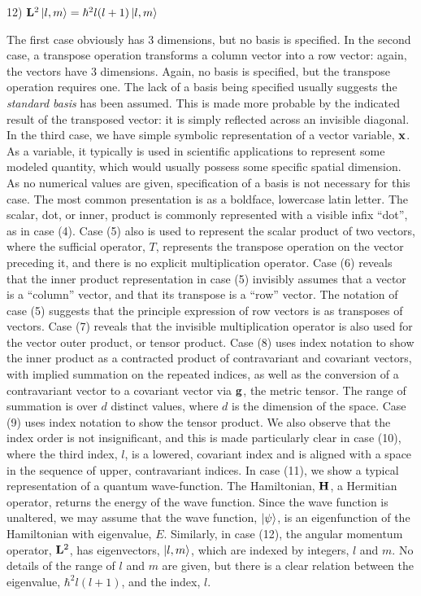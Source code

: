\documentclass{llncs}
\def\ket#1{\mathinner{|{#1}\rangle}}
\begin{document}
12) ${\bf L}^2 \ket{l,m} = \hbar^2l(l+1) \ket{l,m}$


The first case obviously has 3 dimensions, but no basis is specified.
In the second case, a transpose operation transforms a column vector
into a row vector: again, the vectors have 3 dimensions.
Again, no basis is specified, but the transpose operation requires
one.
The lack of a basis being specified usually suggests the
{\em standard basis} has been assumed.
This is made more probable by the indicated result of the transposed
vector: it is simply reflected across an invisible diagonal.
In the third case, we have simple symbolic representation of a vector
variable, ${\bf x}$.
As a variable, it typically is used in scientific applications to
represent some modeled quantity, which would usually possess some
specific spatial dimension.
As no numerical values are given, specification of a basis is not
necessary for this case.
The most common presentation is as a boldface, lowercase latin letter.
The scalar, dot, or inner, product is commonly represented with a
visible infix ``dot'', as in case (4).
Case (5) also is used to represent the scalar product of two vectors,
where the sufficial operator, $T$, represents the transpose operation on
the vector preceding it, and there is no explicit multiplication
operator.
Case (6) reveals that the inner product representation in case (5)
invisibly assumes that a vector is a ``column'' vector, and that its
transpose is a ``row'' vector.
The notation of case (5) suggests that the principle expression of row
vectors is as transposes of vectors.
Case (7) reveals that the invisible multiplication operator is also
used for the vector outer product, or tensor product.
Case (8) uses index notation to show the inner product as a contracted
product of contravariant and covariant vectors, with implied summation
on the repeated indices, as well as the conversion of a contravariant
vector to a covariant vector via ${\bf g}$, the metric tensor.
The range of summation is over $d$ distinct values, where $d$ is the
dimension of the space.
Case (9) uses index notation to show the tensor product.
We also observe that the index order is not insignificant, and this is
made particularly clear in case (10), where the third index, $l$, is a
lowered, covariant index and is aligned with a space in the sequence
of upper, contravariant indices.
In case (11), we show a typical representation of a quantum
wave-function.
The Hamiltonian, ${\bf H}$, a Hermitian operator, returns the energy
of the wave function. 
Since the wave function is unaltered, we may assume that the wave
function, $\ket{\psi}$, is an eigenfunction of the Hamiltonian with
eigenvalue, $E$.
Similarly, in case (12), the angular momentum operator, ${\bf L}^2$,
has eigenvectors, $\ket{l,m}$, which are indexed by integers, $l$ and
$m$.
No details of the range of $l$ and $m$ are given, but there is a clear
relation between the eigenvalue, $\hbar^2 l (l+1)$, and the index, $l$. 
\end{document}
